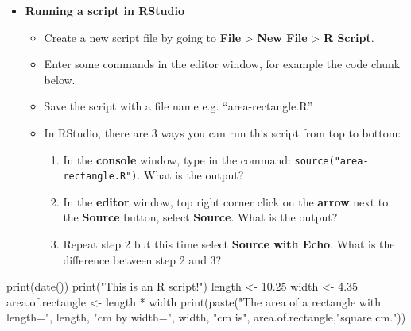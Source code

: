 \documentclass[a4paper]{book}
\newenvironment{Shaded}{}{}
\newcommand{\KeywordTok}[1]{\textcolor[rgb]{0.00,0.00,1.00}{{#1}}}
\newcommand{\FloatTok}[1]{{#1}}
\newcommand{\StringTok}[1]{\textcolor[rgb]{0.00,0.50,0.50}{{#1}}}
\newcommand{\NormalTok}[1]{{#1}}
\providecommand{\tightlist}{%
  \setlength{\itemsep}{0pt}\setlength{\parskip}{0pt}}
\newlength{\leftbarwidth}
\newlength{\leftbarsep}
\newcommand*{\leftbarcolorcmd}{\color{darkgray}}%
\renewenvironment{leftbar}{%
    \def\FrameCommand{{\leftbarcolorcmd{\vrule width \leftbarwidth\relax\hspace {\leftbarsep}}}}%
    \MakeFramed {\advance \hsize -\width \FrameRestore }%
}{%
    \endMakeFramed
}
\renewenvironment{Shaded}
{\vspace{0em}\begin{leftbar}\begin{snugshade}}
{\end{snugshade}\end{leftbar}\vspace{0pt}}
\newenvironment{rmdblock}[1]
  {\vspace{1.5em}\begin{shaded*}
  \begin{itemize}
  \renewcommand{\labelitemi}{
    \raisebox{-.7\height}[0pt][0pt]{
      {\setkeys{Gin}{width=3em,keepaspectratio}\texttt{[image: images/\#1]}}
    }
  }
  \item
  }
  {
  \end{itemize}
  \end{shaded*}
  }
\newenvironment{rmdexercise}
  {\begin{rmdblock}{exercise}}
  {\end{rmdblock}}
\begin{document}
\begin{rmdexercise}
\textbf{Running a script in RStudio}

\begin{itemize}
\item
  Create a new script file by going to \textbf{File} \textgreater{}
  \textbf{New File} \textgreater{} \textbf{R Script}.
\item
  Enter some commands in the editor window, for example the code chunk
  below.
\item
  Save the script with a file name e.g. ``area-rectangle.R''
\item
  In RStudio, there are 3 ways you can run this script from top to
  bottom:

  \begin{enumerate}
  \def\labelenumi{\arabic{enumi}.}
  \tightlist
  \item
    In the \textbf{console} window, type in the command:
    \texttt{source("area-rectangle.R")}. What is the output?
  \item
    In the \textbf{editor} window, top right corner click on the
    \textbf{arrow} next to the \textbf{Source} button, select
    \textbf{Source}. What is the output?
  \item
    Repeat step 2 but this time select \textbf{Source with Echo}. What
    is the difference between step 2 and 3?
  \end{enumerate}
\end{itemize}
\end{rmdexercise}

\begin{Shaded}
\begin{Highlighting}[]
\KeywordTok{print}\NormalTok{(}\KeywordTok{date}\NormalTok{())}
\KeywordTok{print}\NormalTok{(}\StringTok{"This is an R script!"}\NormalTok{)}
\NormalTok{length <-}\StringTok{ }\FloatTok{10.25}
\NormalTok{width <-}\StringTok{ }\FloatTok{4.35}
\NormalTok{area.of.rectangle <-}\StringTok{ }\NormalTok{length *}\StringTok{ }\NormalTok{width}
\KeywordTok{print}\NormalTok{(}\KeywordTok{paste}\NormalTok{(}\StringTok{"The area of a rectangle with length="}\NormalTok{,}
              \NormalTok{length, }
              \StringTok{"cm by width="}\NormalTok{,}
              \NormalTok{width,}
              \StringTok{"cm is"}\NormalTok{,}
              \NormalTok{area.of.rectangle,}\StringTok{"square cm."}\NormalTok{))}
\end{Highlighting}
\end{Shaded}
\end{document}
